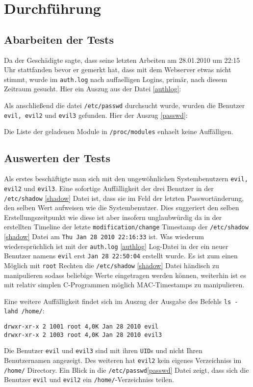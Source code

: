 \section{Durchführung}
\subsection{Abarbeiten der Tests}
Da der Geschädigte sagte, dass seine letzten Arbeiten am 28.01.2010 um 22:15 Uhr stattfanden bevor er gemerkt hat, dass mit dem Webserver etwas nicht stimmt, wurde im \texttt{auth.log} nach auffaelligen Logins, primär, nach diesem Zeitraum gesucht.
Hier ein Auszug aus der Datei \ref{authlog}:
\lstset{basicstyle=\footnotesize, breaklines=true, breakatwhitespace=true}


Als anschließend die datei \texttt{/etc/passwd} durchsucht wurde, wurden die Benutzer \texttt{evil, evil2} und \texttt{evil3} gefunden. Hier der Auszug \ref{passwd}:
\lstset{basicstyle=\footnotesize, breaklines=true, breakatwhitespace=true}



Die Liste der geladenen Module in \texttt{/proc/modules} enhaelt keine Auffälligen.
\pagebreak
\subsection{Auswerten der Tests}
Als erstes beschäftigte man sich mit den ungewöhnlichen Systembenutzern \texttt{evil, evil2} und \texttt{evil3}. Eine sofortige Auffälligkeit der drei Benutzer in der \texttt{/etc/shadow} \ref{shadow} Datei ist, dass sie im Feld der letzten Passwortänderung, den selben Wert aufweisen wie die Systembenutzer. Dies suggeriert den selben Erstellungszeitpunkt wie diese ist aber insofern unglaubwürdig da in der erstellten Timeline der letzte \texttt{modification/change} Timestamp der \texttt{/etc/shadow} \ref{shadow} Datei am \texttt{Thu Jan 28 2010 22:16:33} ist. Was wiederum wiedersprüchlich ist mit der \texttt{auth.log} \ref{authlog} Log-Datei in der ein neuer Benutzer namens \texttt{evil} erst \texttt{Jan 28 22:50:04} erstellt wurde. Es ist zum einen Möglich mit \texttt{root} Rechten die \texttt{/etc/shadow} \ref{shadow} Datei händisch zu manipulieren sodass beliebige Werte eingetragen werden können, weiterhin ist es mit relativ simplen C-Programmen möglich MAC-Timestamps zu manipulieren.

Eine weitere Auffälligkeit findet sich im Auszug der Ausgabe des Befehls \texttt{ls -lahd /home/}:
\begin{verbatim}
drwxr-xr-x 2 1001 root 4,0K Jan 28 2010 evil
drwxr-xr-x 2 1003 root 4,0K Jan 28 2010 evil3
\end{verbatim}
Die Benutzer \texttt{evil} und \texttt{evil3} sind mit ihren \texttt{UID}s und nicht Ihren Benutzernamen angezeigt. Des weiteren hat \texttt{evil2} kein eigenes Verzeichniss im \texttt{/home/} Directory. Ein Blick in die \texttt{/etc/passwd}\ref{passwd} Datei zeigt, dass sich die Benutzer \texttt{evil} und \texttt{evil2} ein \texttt{/home/}-Verzeichniss teilen.
\lstset{basicstyle=\footnotesize, breaklines=true, breakatwhitespace=true}


